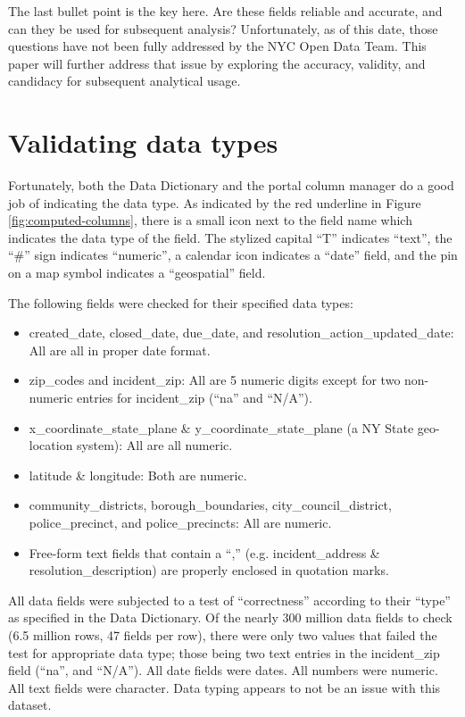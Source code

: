 \documentclass[12pt, titlepage]{article}
\begin{document}
The last bullet point is the key here. Are these fields reliable and accurate, 
and can they be used for subsequent analysis? Unfortunately,
as of this date, those questions have not been fully addressed by the 
NYC Open Data Team. This paper will further address that issue by
exploring the accuracy, validity, and candidacy for subsequent analytical usage.
	
	
	
\section{Validating data types}\label{sec:datatypes}
Fortunately, both the Data Dictionary and the portal column manager 
do a good job of indicating the data type.
As indicated by the red underline in Figure \ref{fig:computed-columns}, 
there is a small icon next to the field name which indicates the 
data type of the field. The stylized capital ``T'' indicates ``text'', the ``\#'' sign indicates 
``numeric'', a calendar icon indicates a ``date'' field, and the pin on a 
map symbol indicates a ``geospatial'' field. 
	
The following fields were checked for their specified data types:
	
\begin{itemize}
	\item created\_date, closed\_date, due\_date, and resolution\_action\_updated\_date: 
	All are all in proper date format.
	\item zip\_codes and incident\_zip: All are 5 numeric digits except 
	for two non-numeric entries for incident\_zip (``na'' and ``N/A'').
	\item x\_coordinate\_state\_plane \&  y\_coordinate\_state\_plane 
	(a NY State geo-location system): All are all numeric.
	\item latitude \& longitude: Both are numeric.
	\item community\_districts, borough\_boundaries, 
	city\_council\_district, police\_precinct, and police\_precincts: All are numeric.
	\item Free-form text fields that contain a ``,'' (e.g. incident\_address 
	\& resolution\_description) are properly enclosed in quotation marks.
\end{itemize}	

All data fields were subjected to a test of ``correctness'' 
according to their ``type'' as specified
in the Data Dictionary. Of the nearly 300 million data fields to check 
(6.5 million rows, 47 fields per row), there were only two values that failed 
the test for appropriate data type; those being two text entries in the 
incident\_zip field (``na'', and ``N/A''). All date fields were dates. 
All numbers were numeric. All text fields were character. 
Data typing appears to not be an issue with this dataset.
\end{document}
